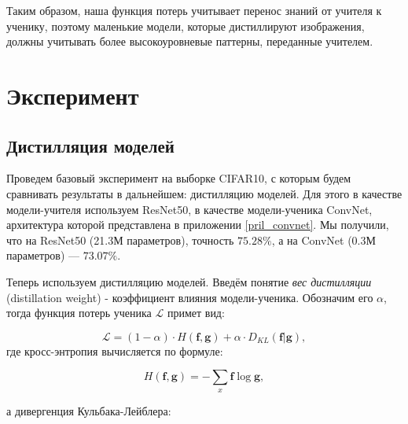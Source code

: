 \documentclass[12pt]{article}
\begin{document}
Таким образом, наша функция потерь учитывает перенос знаний от учителя к ученику, поэтому маленькие модели, которые дистиллируют изображения, должны учитывать более высокоуровневые паттерны, переданные учителем.



%

\section{Эксперимент}
\subsection{Дистилляция моделей}\label{41}

Проведем базовый эксперимент на выборке CIFAR10, с которым будем сравнивать результаты в дальнейшем: дистилляцию моделей. Для этого в качестве модели-учителя используем ResNet50, в качестве модели-ученика ConvNet, архитектура которой представлена в приложении \ref{pril_convnet}. Мы получили, что на ResNet50 (21.3М параметров), точность $75.28\%$, а на ConvNet (0.3М параметров) --- $73.07\%$.


Теперь используем дистилляцию моделей. Введём понятие \textit{вес дистилляции} (distillation weight) - коэффициент влияния модели-ученика. Обозначим его $\alpha$, тогда функция потерь ученика $\mathcal{L}$ примет вид:

\begin{equation}\label{eq5}
    \mathcal{L} = (1 - \alpha) \cdot H(\mathbf{f}, \mathbf{g}) + \alpha \cdot D_{KL}(\mathbf{f}|\mathbf{g}),
\end{equation}
где кросс-энтропия вычисляется по формуле:

\begin{equation}\label{eq6}
    H(\mathbf{f},\mathbf{g}) = -\sum_{x} \mathbf{f}\log \mathbf{g} ,
\end{equation}

а дивергенция Кульбака-Лейблера:

\end{document}
